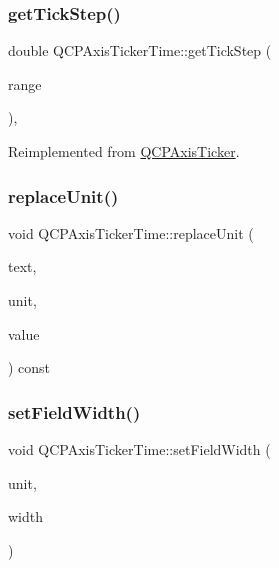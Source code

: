 \subsubsection{\texorpdfstring{getTickStep()}{getTickStep()}}
{\footnotesize\ttfamily double Q\+C\+P\+Axis\+Ticker\+Time\+::get\+Tick\+Step (\begin{DoxyParamCaption}\item[{const \mbox{\hyperlink{class_q_c_p_range}{Q\+C\+P\+Range}} \&}]{range }\end{DoxyParamCaption})\hspace{0.3cm}{\ttfamily [protected]}, {\ttfamily [virtual]}}



Reimplemented from \mbox{\hyperlink{class_q_c_p_axis_ticker_a910d69bcec2de37e92d8d4e1ecf201e2}{Q\+C\+P\+Axis\+Ticker}}.

\mbox{\label{class_q_c_p_axis_ticker_time_a03b6c980be36f2672e3fc31d109a28a0}} 
\subsubsection{\texorpdfstring{replaceUnit()}{replaceUnit()}}
{\footnotesize\ttfamily void Q\+C\+P\+Axis\+Ticker\+Time\+::replace\+Unit (\begin{DoxyParamCaption}\item[{Q\+String \&}]{text,  }\item[{\mbox{\hyperlink{class_q_c_p_axis_ticker_time_a5c48ded8c6d3a1aca9b68219469fea3e}{Q\+C\+P\+Axis\+Ticker\+Time\+::\+Time\+Unit}}}]{unit,  }\item[{int}]{value }\end{DoxyParamCaption}) const\hspace{0.3cm}{\ttfamily [protected]}}

\mbox{\label{class_q_c_p_axis_ticker_time_adc13e54fc969be98a5c0e3fa0dbaa293}} 
\subsubsection{\texorpdfstring{setFieldWidth()}{setFieldWidth()}}
{\footnotesize\ttfamily void Q\+C\+P\+Axis\+Ticker\+Time\+::set\+Field\+Width (\begin{DoxyParamCaption}\item[{\mbox{\hyperlink{class_q_c_p_axis_ticker_time_a5c48ded8c6d3a1aca9b68219469fea3e}{Q\+C\+P\+Axis\+Ticker\+Time\+::\+Time\+Unit}}}]{unit,  }\item[{int}]{width }\end{DoxyParamCaption})}

